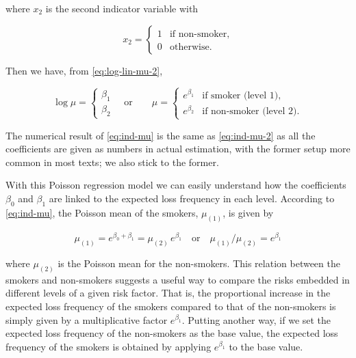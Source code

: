 \documentclass[]{book}
\theoremstyle{definition}
\theoremstyle{definition}
\theoremstyle{definition}
\theoremstyle{remark}
\begin{document}
where \(x_2\) is the second indicator variable with

\begin{equation}
x_2=
\begin{cases}
     1 & \text{if non-smoker}, \\
     0 & \text{otherwise}.
\end{cases}
\label{eq:dummy-x-2}
\end{equation}

Then we have, from \eqref{eq:log-lin-mu-2},

\begin{equation}
\log \mu=
\begin{cases}
     \beta_1 \\
     \beta_2 
\end{cases}
\quad \text{or}\qquad \mu= \begin{cases}
     e^{\beta_1} & \text{if smoker (level 1)}, \\
     e^{\beta_2} & \text{if non-smoker (level 2)}.
\end{cases}
\label{eq:ind-mu-2}
\end{equation}

The numerical result of \eqref{eq:ind-mu} is the same as \eqref{eq:ind-mu-2}
as all the coefficients are given as numbers in actual estimation, with
the former setup more common in most texts; we also stick to the former.

With this Poisson regression model we can easily understand how the
coefficients \(\beta_0\) and \(\beta_1\) are linked to the expected loss
frequency in each level. According to \eqref{eq:ind-mu}, the Poisson mean
of the smokers, \(\mu_{(1)}\), is given by

\begin{equation}
\mu_{(1)}=e^{\beta_0+\beta_1}=\mu_{(2)} \,e^{\beta_1} \quad \text{or}\quad  \mu_{(1)}/\mu_{(2)} =e^{\beta_1}
\label{eq:no-label}
\end{equation}

where \(\mu_{(2)}\) is the Poisson mean for the non-smokers. This
relation between the smokers and non-smokers suggests a useful way to
compare the risks embedded in different levels of a given risk factor.
That is, the proportional increase in the expected loss frequency of the
smokers compared to that of the non-smokers is simply given by a
multiplicative factor \(e^{\beta_1}\). Putting another way, if we set
the expected loss frequency of the non-smokers as the base value, the
expected loss frequency of the smokers is obtained by applying
\(e^{\beta_1}\) to the base value.
\end{document}
